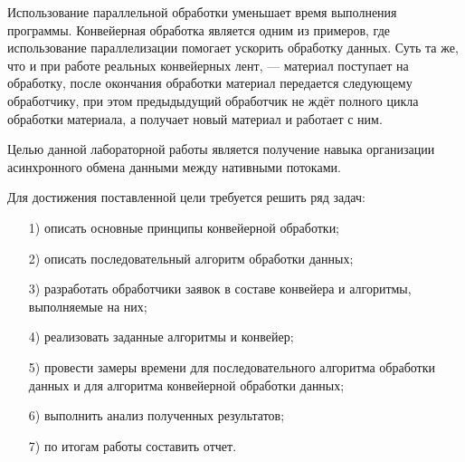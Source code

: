 

Использование параллельной обработки уменьшает время выполнения программы. Конвейерная обработка является одним из примеров, где использование параллелизации помогает ускорить обработку данных. Суть та же, что и при работе реальных конвейерных лент, ---
материал поступает на обработку, после окончания обработки материал передается следующему обработчику, при этом предыдыдущий
обработчик не ждёт полного цикла обработки материала, а получает новый
материал и работает с ним.

Целью данной лабораторной работы является получение навыка организации асинхронного обмена данными между нативными потоками.

Для достижения поставленной цели требуется решить ряд задач:
\begin{enumerate}
	\item[1)] описать основные принципы конвейерной обработки;
	\item[2)] описать последовательный алгоритм обработки данных;
	\item[3)]
	разработать обработчики заявок в составе конвейера и алгоритмы, выполняемые на них;
	\item[4)] реализовать заданные алгоритмы и конвейер;
	\item[5)] провести замеры времени для последовательного алгоритма обработки данных и для алгоритма конвейерной обработки данных;%
 	\item[6)] выполнить анализ полученных результатов;
	\item[7)] по итогам работы составить отчет.
\end{enumerate}

\newpage
